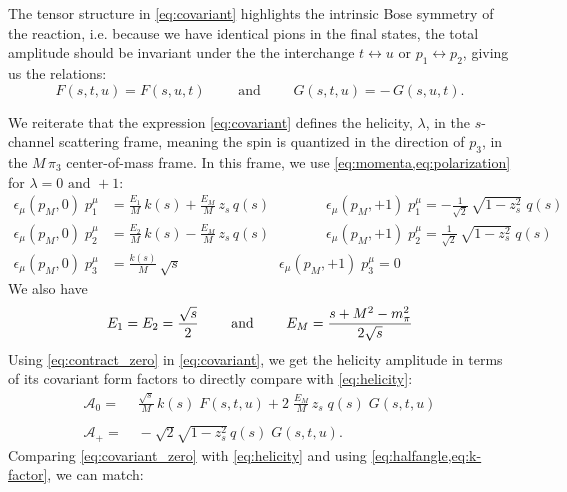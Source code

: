 The  tensor structure in \cref{eq:covariant} highlights the intrinsic Bose symmetry of the reaction, i.e. because we have identical pions in the final states, the total amplitude should be invariant under the the interchange \(t \leftrightarrow u \) or \(p_1 \leftrightarrow p_2\), giving us the relations:
   \begin{equation}
     F(s,t,u) = F(s,u,t) \qquad \text{ and } \qquad G(s,t,u) = - \, G(s,u,t).
   \end{equation}

 We reiterate that the expression \cref{eq:covariant} defines the helicity, \(\lambda\), in the \(s\)-channel scattering frame, meaning the spin is quantized in the direction of \(p_3\), in the \(M \, \pi_3\) center-of-mass frame.
 In this frame, we use \cref{eq:momenta,eq:polarization} for \(\lambda = 0 \text{ and } +1 \):
   \begin{align}
     \label{eq:contract_zero}
     \epsilon_\mu(p_M,0) \; p_1^\mu &= \frac{E_1}{M} \, k(s) + \frac{E_M}{M} \,  z_s \, q(s)
     \qquad \qquad \epsilon_\mu(p_M,+1) \; p_1^\mu = - \frac{1}{\sqrt{2}} \, \sqrt{1 - z_s^2} \; q(s) \nonumber \\
     \epsilon_\mu(p_M,0) \; p_2^\mu &= \frac{E_2}{M} \, k(s) - \frac{E_M}{M} \,  z_s \, q(s)
     \qquad \qquad \epsilon_\mu(p_M,+1) \; p_2^\mu =  \frac{1}{\sqrt{2}} \, \sqrt{1 - z_s^2} \; q(s)  \\
     \epsilon_\mu(p_M,0) \; p_3^\mu &= \frac{k(s)}{M} \, \sqrt{s}
     \qquad \qquad \qquad \quad \epsilon_\mu(p_M,+1) \; p_3^\mu = 0 \nonumber
   \end{align}
 We also have
   \begin{equation}
     \label{eq:energies}
     E_1 = E_2 = \frac{\sqrt{s}}{2} \qquad \text{ and } \qquad E_M = \frac{s + M^2 - m_\pi^2}{2 \sqrt{s}}
   \end{equation}
 Using \cref{eq:contract_zero} in \cref{eq:covariant}, we get the helicity amplitude in terms of its covariant form factors to directly compare with \cref{eq:helicity}:
  \begin{align}
   \label{eq:covariant_zero}
    \mathcal{A}_0 =& \; \frac{\sqrt{s}}{M} \, k(s) \; F(s,t,u) + 2 \; \frac{E_M}{M} \, z_s \; q(s) \; G(s,t,u) \\
    \nonumber \\
    \label{eq:covariant_plus}
    \mathcal{A}_+ =& \; - \sqrt{2} \sqrt{1-z_s^2} \, q(s) \; G(s,t,u).
  \end{align}
 Comparing \cref{eq:covariant_zero} with \cref{eq:helicity} and using \cref{eq:halfangle,eq:k-factor}, we can match:
